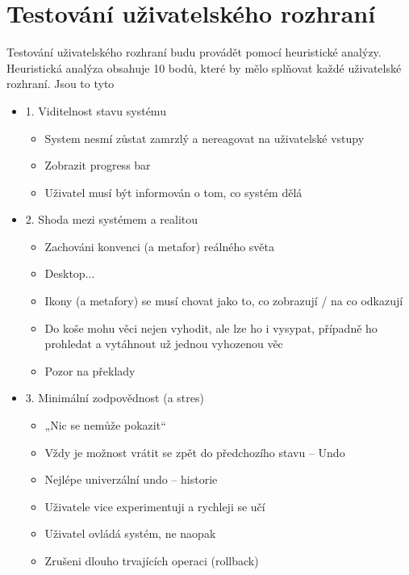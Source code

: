 \section{Testování uživatelského rozhraní}

\label{nur:test}

Testování uživatelského rozhraní budu provádět pomocí heuristické analýzy. Heuristická analýza obsahuje 10 bodů, které by mělo splňovat každé uživatelské rozhraní. Jsou to tyto \cite{nur-heu}

\begin{itemize}
    \item 1. Viditelnost stavu systému
        \begin{itemize}
            \item System nesmí zůstat zamrzlý a nereagovat na uživatelské vstupy
            \item Zobrazit progress bar
            \item Uživatel musí být informován o tom, co systém dělá
        \end{itemize}
    \item 2. Shoda mezi systémem a realitou
        \begin{itemize}
            \item Zachováni konvenci (a metafor) reálného světa
            \item Desktop...
            \item Ikony (a metafory) se musí chovat jako to, co zobrazují / na co odkazují
            \item Do koše mohu věci nejen vyhodit, ale lze ho i vysypat, případně ho prohledat a vytáhnout už jednou vyhozenou věc
            \item Pozor na překlady
        \end{itemize}
    \item 3. Minimální zodpovědnost (a stres)
        \begin{itemize}
            \item „Nic se nemůže pokazit“
            \item Vždy je možnost vrátit se zpět do předchozího stavu – Undo
            \item Nejlépe univerzální undo – historie
            \item Uživatele vice experimentuji a rychleji se učí
            \item Uživatel ovládá systém, ne naopak
            \item Zrušeni dlouho trvajících operaci (rollback)

\end{itemize}
\end{itemize}
